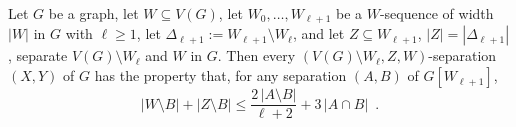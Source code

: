 \documentclass{patmorin}
\newcommand{\pat}[1]{\textcolor{Blue}{[Pat: #1]}}
\begin{document}
\begin{lem}\label{z_w_bound}
  Let $G$ be a graph, let $W\subseteq V(G)$, let $W_0,\ldots,W_{\ell+1}$ be a $W$-sequence of width $|W|$ in $G$ with $\ell\ge 1$, let $\Delta_{\ell+1}:=W_{\ell+1}\setminus W_{\ell}$,  and let $Z\subseteq W_{\ell+1}$, $|Z|=|\Delta_{\ell+1}|$, separate $V(G)\setminus W_{\ell}$ and $W$ in $G$.
  Then every $(V(G)\setminus W_{\ell},Z,W)$-separation $(X,Y)$ of $G$ has the property that, for any separation
  $(A,B)$ of $G[W_{\ell+1}]$,
  \[
    |W\setminus B|+|Z\setminus B|\le \frac{2\,|A\setminus B|}{\ell+2}+3\,|A\cap B| \enspace .
  \]
\end{lem}


\end{document}
